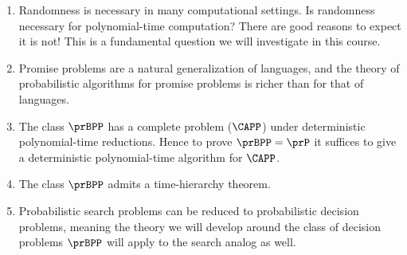 \begin{enumerate}
  \item Randomness is necessary in many computational settings. Is randomness
    necessary for polynomial-time computation? There are good reasons to expect
    it is not! This is a fundamental question we will investigate in this
    course.
  \item Promise problems are a natural generalization of languages, and the
    theory of probabilistic algorithms for promise problems is richer than
    for that of languages.
  \item The class $\prBPP$ has a complete problem ($\CAPP$) under deterministic
    polynomial-time reductions. Hence to prove $\prBPP = \prP$ it suffices
    to give a deterministic polynomial-time algorithm for $\CAPP$.
  \item The class $\prBPP$ admits a time-hierarchy theorem.
  \item Probabilistic search problems can be reduced to probabilistic decision
    problems, meaning the theory we will develop around the class of decision
    problems $\prBPP$ will apply to the search analog as well.
\end{enumerate}
